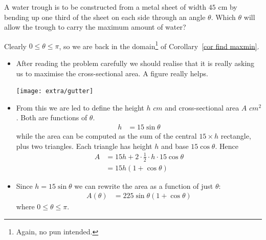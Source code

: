 \begin{eg}\label{APPglobalMaxMinrain}
A water trough is to be constructed from a metal sheet of width $45$ cm
by bending up one third of the sheet on each side through an angle
$\theta$.  Which $\theta$ will allow the trough to carry the maximum
amount of water?


\soln Clearly $0 \leq \theta \leq \pi$, so we are back in the domain\footnote{Again, no
pun intended.} of Corollary~\ref{cor find maxmin}.
\begin{itemize}
 \item After reading the problem carefully we should realise that it is really asking us
to maximise the cross-sectional area. A figure really helps.

\begin{efig}
\begin{center}
   \texttt{[image: extra/gutter]}
\end{center}
\end{efig}

\item From this we are led to define the height $h$ $cm$ and cross-sectional area $A$
$cm^2$. Both are functions of $\theta$.
\begin{align*}
  h &= 15 \sin \theta
\end{align*}
while the area can be computed as the sum of the central $15 \times h$ rectangle, plus
two triangles. Each triangle has height $h$ and base $15 \cos \theta$. Hence
\begin{align*}
  A &= 15h + 2 \cdot \frac{1}{2} \cdot h \cdot 15 \cos \theta \\
  &= 15h \left(1 + \cos \theta \right)
\end{align*}
\item Since $h = 15\sin \theta$ we can rewrite the area as a function of just $\theta$:
\begin{align*}
  A(\theta) &= 225 \sin\theta \left(1 + \cos \theta \right)
\end{align*}
where $0 \leq \theta \leq \pi$.


\end{itemize}
\end{eg}
